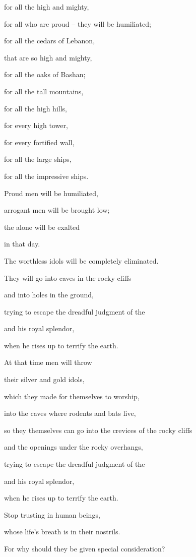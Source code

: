 {\par }{\Q for all
the high
and mighty,
\par }{\Q for all
who are proud
– they will be humiliated;
\par }{\Q {}for all
the cedars
of Lebanon,
\par }{\Q that are so high
and mighty,
\par }{\Q for all
the oaks
of Bashan;
\par }{\Q {}for all
the tall mountains,
\par }{\Q for all
the high
hills,
\par }{\Q {}for every
high
tower,
\par }{\Q for every
fortified
wall,
\par }{\Q {}for
all
the large ships,
\par }{\Q for
all
the impressive
ships.
\par }{\Q {}Proud
men
will be humiliated,
\par }{\Q arrogant
men
will be brought low;
\par }{\Q the {}
alone
will be exalted
\par }{\Q in that day.
\par }{\Q {}The worthless idols
will be completely
eliminated.
\par }{\Q {}They will go
into caves
in the rocky
cliffs
\par }{\Q and into holes
in the ground,
\par }{\Q trying to escape the dreadful
judgment of the
{}
\par }{\Q and his royal
splendor,
\par }{\Q when he rises
up to terrify
the earth.
\par }{\Q {}At that
time
men
will throw
\par }{\Q their silver
and gold
idols,
\par }{\Q which
they made
for themselves to worship,
\par }{\Q into the caves where rodents
and bats live,
\par }{\Q {}so they themselves can go into
the crevices
of the rocky
cliffs
\par }{\Q and the openings under the rocky
overhangs,

\par }{\Q trying to escape
the dreadful judgment
of the {}
\par }{\Q and his royal
splendor,
\par }{\Q when he rises up
to terrify
the earth.
\par }{\Q {}Stop
trusting
in human
beings,
\par }{\Q whose
life’s breath
is in their nostrils.
\par }{\Q For
why
should they be
given special consideration?

}

